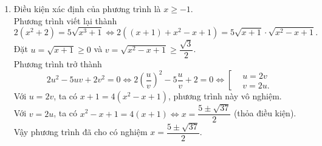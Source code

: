 \begin{vd}
{\begin{enumerate}
			Phương trình đã cho trở thành
			\begin{eqnarray*}
				t-\dfrac{3}{t}=-2 \Leftrightarrow t^2+2t-3=0 \Leftrightarrow \left[\begin{aligned}&t=1 &&\text{(nhận)} \\&t=-3 &&\text{(loại).} \end{aligned}\right.
			\end{eqnarray*}
			Với $t=1$, ta có
			\begin{eqnarray*}
				\sqrt{x-\sqrt{x^2-1}}=1 \Leftrightarrow x-\sqrt{x^2-1}=1 \Leftrightarrow \sqrt{x^2-1}=x-1 \Leftrightarrow \heva{&x \geq 1 \\& x^2-1 =(x-1)^2} \Leftrightarrow x=1.
			\end{eqnarray*}
			Đối chiếu điều kiện, suy ra phương trình đã cho có nghiệm $x=1$.
			\item Điều kiện xác định của phương trình là $x\geq -1$.\\
			Phương trình viết lại thành 
			$$2\left(x^2+2\right)=5\sqrt{x^3+1}
			\Leftrightarrow 2\left((x+1)+x^2-x+1\right)=5\sqrt{x+1}\cdot \sqrt{x^2-x+1}.$$
			Đặt $u=\sqrt{x+1}\geq 0$ và $v=\sqrt{x^2-x+1}\geq \dfrac{\sqrt{3}}{2}$.\\
			Phương trình trở thành
			$$2u^2-5uv+2v^2=0 \Leftrightarrow 2\left(\dfrac{u}{v}\right)^2 -5\dfrac{u}{v}+2=0 \Leftrightarrow \left[\begin{aligned}&u=2v \\&v=2u.\end{aligned}\right.$$
			Với $u=2v$, ta có $x+1=4(x^2-x+1)$, phương trình này vô nghiệm.\\
			Với $v=2u$, ta có $x^2-x+1=4(x+1) \Leftrightarrow x=\dfrac{5\pm\sqrt{37}}{2}$ (thỏa điều kiện).\\
			Vậy phương trình đã cho có nghiệm $x=\dfrac{5\pm\sqrt{37}}{2}$.
		\end{enumerate}	
	}
\end{vd}



